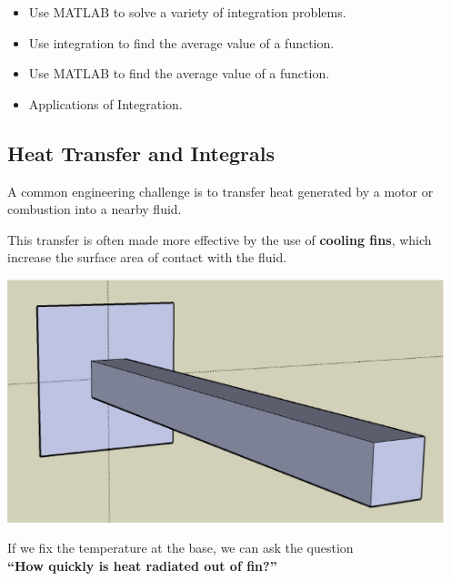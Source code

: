 



\setfont
\pagestyle{fancy}
\renewcommand{\Week}{6 }
\renewcommand{\WeekTitle}{\WeekTitleSix }

\fancyhead[LE,RO]{Week \Week}  %
\fancyfoot{}
\sectionbox{Week \#\Week: \WeekTitle}


\vspace{5mm}
\goals
\begin{itemize}
\item Use MATLAB to solve a variety of integration problems. 
\item Use integration to find the average value of a function.
\item Use MATLAB to find the average value of a function. 
\item Applications of Integration.
\end{itemize}
\vspace{5mm}


\subsection*{Heat Transfer and Integrals}
A common engineering challenge is to transfer heat generated by a
motor or combustion into a nearby fluid.

This transfer is often made more effective by the use of {\bf cooling
  fins}, which increase the surface area of contact with the fluid.

\begin{center}
  \includegraphics[width=5in]{graphics/notes_06_LongPin3D}
\end{center}

If we fix the temperature at the base, we can ask the question \\
{\bf ``How quickly is heat radiated out of fin?''}

